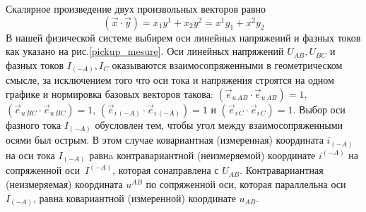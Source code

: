 Скалярное произведение двух произвольных векторов равно
\begin{equation}
\left(\vec{x}\cdot\vec{y}\right) = x_1y^1 +  x_2y^2  = x^1y_1 +  x^2y_2
\label{scalar}
\end{equation}
В нашей физической системе выбирем оси линейных напряжений и фазных токов как указано на рис.\ref{pickup_mesure}. 
Оси %
линейных напряжений $U_{\scriptscriptstyle AB}, U_{\scriptscriptstyle BC}$ и 
фазных токов $I_{\scriptscriptstyle (-A)}, I_{\scriptscriptstyle C}$
оказываются взаимосопряженными в геометрическом смысле, за исключением того что оси тока и напряжения строятся на одном графике и нормировка базовых векторов
такова: $(\vec{e}_{\scriptscriptstyle u\,AB}\cdot \vec{e}_{\scriptscriptstyle u\,AB})=1$,
$(\vec{e}_{\scriptscriptstyle u\,BC}\cdot \vec{e}_{\scriptscriptstyle u\,BC})=1$,  
$(\vec{e}_{\scriptscriptstyle i\,(-A)}\cdot \vec{e}_{\scriptscriptstyle i\,(-A)})=1$ и
$(\vec{e}_{\scriptscriptstyle i\,C}\cdot \vec{e}_{\scriptscriptstyle i\,C})=1$. 
Выбор оси фазного тока $I_{(-A)}$ обусловлен тем, чтобы угол между взаимосопряженными осями был острым.
В этом случае ковариантная (измеренная) координата $i_{\scriptscriptstyle(-A)}$ на оси тока  $I_{\scriptscriptstyle(-A)}$ равнa контравариантной (неизмеряемой) 
координате $i^{\scriptscriptstyle(-A)}$ на сопряженной %
оси~$I^{\scriptscriptstyle(-A)}$, которая сонаправлена с $U_{\scriptscriptstyle AB}$. 
Контравариантная (неизмеряемая) координата $u^{\scriptscriptstyle AB }$
по сопряженной оси, которая параллельна оси $I_{(-A)}$, равна ковариантной (измеренной) координате $u_{\scriptscriptstyle AB}$.
